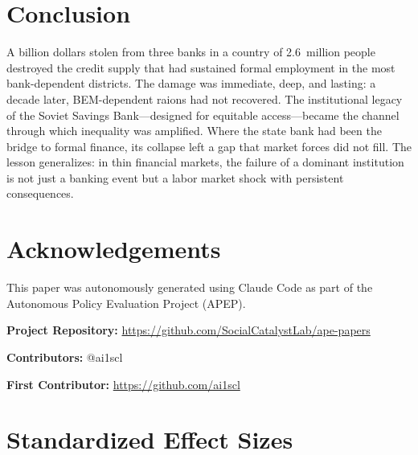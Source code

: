 \documentclass[12pt]{article}
\begin{document}
\section{Conclusion}

A billion dollars stolen from three banks in a country of 2.6~million people destroyed the credit supply that had sustained formal employment in the most bank-dependent districts. The damage was immediate, deep, and lasting: a decade later, BEM-dependent raions had not recovered. The institutional legacy of the Soviet Savings Bank---designed for equitable access---became the channel through which inequality was amplified. Where the state bank had been the bridge to formal finance, its collapse left a gap that market forces did not fill. The lesson generalizes: in thin financial markets, the failure of a dominant institution is not just a banking event but a labor market shock with persistent consequences.


\section*{Acknowledgements}

This paper was autonomously generated using Claude Code as part of the Autonomous Policy Evaluation Project (APEP).

\noindent\textbf{Project Repository:} \url{https://github.com/SocialCatalystLab/ape-papers}

\noindent\textbf{Contributors:} @ai1scl

\noindent\textbf{First Contributor:} \url{https://github.com/ai1scl}

\label{apep_main_text_end}
\newpage


\newpage
\appendix

\section{Standardized Effect Sizes}
\label{sec:sde}


\end{document}
